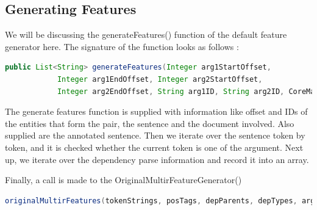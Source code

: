 \documentclass[a4paper,10pt]{report}
\begin{document}
\subsection{Generating Features}
We will be discussing the generateFeatures() function of the default feature generator here. The signature of the function looks as follows :

\begin{lstlisting}[language=java]
public List<String> generateFeatures(Integer arg1StartOffset,
			Integer arg1EndOffset, Integer arg2StartOffset,
			Integer arg2EndOffset, String arg1ID, String arg2ID, CoreMap sentence, Annotation document) {
\end{lstlisting}

The generate features function is supplied with information like offset and IDs of the entities that form the pair, the sentence and the document involved. 
Also supplied are the annotated sentence. 
Then we iterate over the sentence token by token, and it is checked whether the current token is one of the argument. 
Next up, we iterate over the dependency parse information and record it into an array. 

Finally, a call is made to the OriginalMultirFeatureGenerator()
\begin{lstlisting}[language=java]
 originalMultirFeatures(tokenStrings, posTags, depParents, depTypes, arg1Pos, arg2Pos, arg1ner, arg2ner);
\end{lstlisting}
\end{document}
